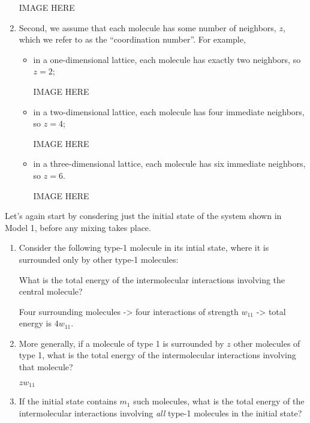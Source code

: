 \begin{activity}
\begin{model}
\begin{enumerate}
	IMAGE HERE
	
	\item Second, we assume that each molecule has some number of neighbors, $z$, which we refer to as the ``coordination number''.  For example,
		\begin{itemize}
			\item in a one-dimensional lattice, each molecule has exactly two neighbors, so $z=2$;
	
	IMAGE HERE
	
			\item in a two-dimensional lattice, each molecule has four immediate neighbors, so $z=4$;
	
	IMAGE HERE
	
			\item in a three-dimensional lattice, each molecule has six immediate neighbors, so $z=6$.
	
	IMAGE HERE
		\end{itemize}
\end{enumerate}

\end{model}

\begin{ctqs}

		\question Let's again start by consdering just the initial state of the system shown in Model 1, before any mixing takes place.
		
			\begin{enumerate}
				\item Consider the following type-1 molecule in its intial state, where it is surrounded only by other type-1 molecules:
		
		What is the total energy of the intermolecular interactions involving the central molecule?
		
					\begin{solution}[0.75in]
						Four surrounding molecules -> four interactions of strength $w_{11}$ -> total energy is $4 w_{11}$.
					\end{solution}
		
				\item More generally, if a molecule of type 1 is surrounded by $z$ other molecules of type 1, what is the total energy of the intermolecular interactions involving that molecule?
				
					\begin{solution}[0.75in]
						$z w_{11}$
					\end{solution}
		
				\item If the initial state contains $m_1$ such molecules, what is the total energy of the intermolecular interactions involving \emph{all} type-1 molecules in the initial state?
				

\end{enumerate}
\end{ctqs}
\end{activity}
